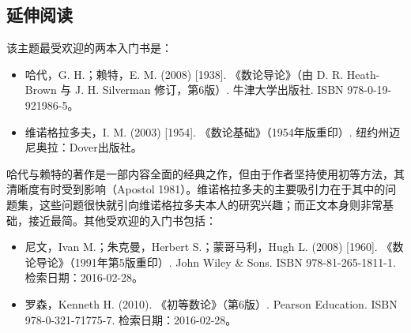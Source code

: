 \subsection{延伸阅读}
该主题最受欢迎的两本入门书是：
\begin{itemize}
\item 哈代，G. H.；赖特，E. M. (2008) [1938]. 《数论导论》（由 D. R. Heath-Brown 与 J. H. Silverman 修订，第6版）. 牛津大学出版社. ISBN 978-0-19-921986-5。
\item 维诺格拉多夫，I. M. (2003) [1954]. 《数论基础》（1954年版重印）. 纽约州迈尼奥拉：Dover出版社。
\end{itemize}
哈代与赖特的著作是一部内容全面的经典之作，但由于作者坚持使用初等方法，其清晰度有时受到影响（Apostol 1981）。维诺格拉多夫的主要吸引力在于其中的问题集，这些问题很快就引向维诺格拉多夫本人的研究兴趣；而正文本身则非常基础，接近最简。其他受欢迎的入门书包括：
\begin{itemize}
\item 尼文，Ivan M.；朱克曼，Herbert S.；蒙哥马利，Hugh L. (2008) [1960]. 《数论导论》（1991年第5版重印）. John Wiley & Sons. ISBN 978-81-265-1811-1. 检索日期：2016-02-28。
\item 罗森，Kenneth H. (2010). 《初等数论》（第6版）. Pearson Education. ISBN 978-0-321-71775-7. 检索日期：2016-02-28。
\end{itemize}